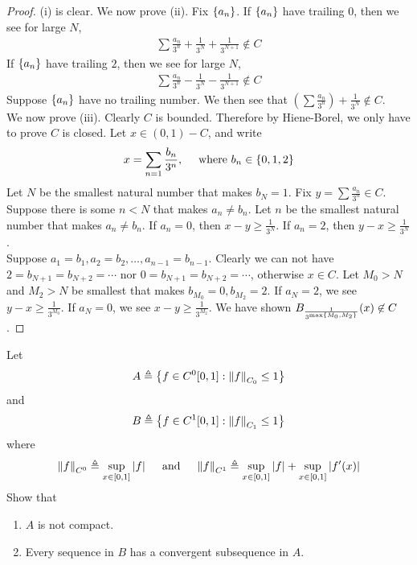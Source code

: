 \documentclass{report}
\begin{document}
\begin{proof}
  (i) is clear. We now prove (ii). Fix $\left\{ a_n \right\}$. If $\left\{ a_n \right\}$ have trailing $0$, then we see for large $N$, 
  \begin{align*}
  \sum \frac{a_n}{3^n} + \frac{1}{3^N} + \frac{1}{3^{N+1}} \not \in C
  \end{align*}
If $\left\{ a_n \right\}$ have trailing $2$, then we see for large $N$,  
 \begin{align*}
\sum \frac{a_n}{3^n} - \frac{1}{3^N} - \frac{1}{3^{N+1}} \not \in C
\end{align*}
Suppose $\left\{ a_n \right\}$ have no trailing number. We then see that $\left(\sum \frac{a_n}{3^n}\right)+ \frac{1}{3^N} \not \in C$.  \\

We now prove (iii). Clearly $C$ is bounded. Therefore by Hiene-Borel, we only have to prove $C$ is closed. Let  $x\in (0,1) - C$, and write 
\begin{align*}
x= \sum_{n=1} \frac{b_n}{3^n}, \quad \text{ where }b_n \in \left\{ 0,1,2 \right\}
\end{align*}
Let $N$ be the smallest natural number that makes $b_N=1$. Fix  $y= \sum \frac{a_n}{3^n} \in C$. Suppose there is some $n<N$ that makes  $a_n \neq b_n$. Let $n$ be the smallest natural number that makes $a_n\neq b_n$. If $a_n=0$, then  $x-y \geq \frac{1}{3^N}$. If $a_n=2$, then  $y-x \geq \frac{1}{3^N}$. \\

Suppose $a_1=b_1,a_2=b_2,\dots ,a_{n-1}=b_{n-1}$. Clearly we can not have $2=b_{N+1}=b_{N+2}=  \cdots $ nor $0=b_{N+1}=b_{N+2}= \cdots$, otherwise $x \in C$.  Let $M_0>N$ and  $M_2>N$ be smallest that makes  $b_{M_0}=0,b_{M_2}=2$. If $a_N=2$, we see  $y-x \geq \frac{1}{3^{M_0}}$. If $a_N=0$, we see  $x-y \geq \frac{1}{3^{M_2}}$. We have shown $B_{\frac{1}{3^{\max \left\{ M_0,M_2 \right\}}}}(x)\not \in C$. 



\end{proof}
\begin{question}{}{}
Let 
\begin{align*}
A\triangleq \left\{ f \in C^0[0,1]: \left\| f \right\|_{C_0}\leq 1 \right\}
\end{align*}
and 
\begin{align*}
B \triangleq \left\{ f \in C^1[0,1]: \left\| f \right\|_{C_1}\leq 1 \right\}
\end{align*}
where 
\begin{align*}
\left\| f \right\|_{C^0}\triangleq \sup_{x \in [0,1]} \left|f\right|\quad \text{ and }\quad \left\| f \right\|_{C^1} \triangleq \sup_{x \in [0,1]} \left|f\right| + \sup_{x \in [0,1]} \left|f'(x)\right|
\end{align*}
Show that
\begin{enumerate}[label=(\roman*)]
  \item $A$ is not compact. 
  \item Every sequence in $B$ has a convergent subsequence in  $A$. 
\end{enumerate}
\end{question}
\end{document}
